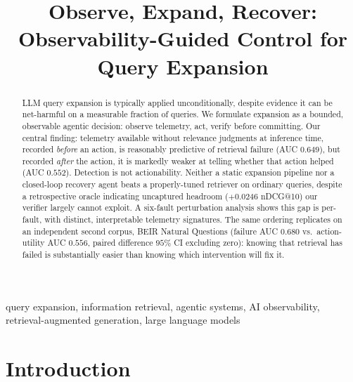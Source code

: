 \documentclass[conference]{IEEEtran}
\begin{document}
\title{Observe, Expand, Recover: Observability-Guided Control for Query Expansion}

\author{
\IEEEauthorblockN{[author]\textsuperscript{*}}
\and
\IEEEauthorblockN{[coauthor]}
}

\maketitle
\small

\begin{abstract}
LLM query expansion is typically applied unconditionally, despite
evidence it can be net-harmful on a measurable fraction of queries. We
formulate expansion as a bounded, observable agentic decision: observe
telemetry, act, verify before committing. Our central finding:
telemetry available without relevance judgments at inference time,
recorded \emph{before} an action, is reasonably predictive of
retrieval failure (AUC $0.649$), but recorded \emph{after} the action,
it is markedly weaker at telling whether that action helped (AUC
$0.552$). Detection is not actionability. Neither a static expansion
pipeline nor a closed-loop recovery agent beats a properly-tuned
retriever on ordinary queries, despite a retrospective oracle
indicating uncaptured headroom ($+0.0246$ nDCG@10) our verifier largely
cannot exploit. A six-fault perturbation analysis shows this gap is
per-fault, with distinct, interpretable telemetry signatures. The same
ordering replicates on an independent second corpus, BEIR Natural
Questions (failure AUC $0.680$ vs.\ action-utility AUC $0.556$, paired
difference $95\%$ CI excluding zero): knowing that retrieval has
failed is substantially easier than knowing which intervention will
fix it.
\end{abstract}

\begin{IEEEkeywords}
query expansion, information retrieval, agentic systems, AI observability, retrieval-augmented generation, large language models
\end{IEEEkeywords}

\section{Introduction}
\end{document}
